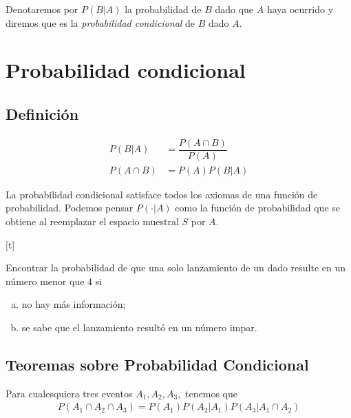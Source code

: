   Denotaremos por $P(B|A)$
 la probabilidad de $B$ dado que $A$ haya ocurrido y diremos que es la \emph{probabilidad condicional} de $B$ dado $A.$


 \section{Probabilidad condicional}

 \subsection{Definición}

{}
\begin{defn}
 \begin{align}
  P(B|A)&=\dfrac{P(A\cap B)}{P(A)} \\
  P(A\cap B) &= P(A)P(B|A)
 \end{align}
\end{defn}


{}
\begin{rem}
 La probabilidad condicional satisface todos los axiomas de una función de probabilidad.  Podemos pensar $P(\cdot|A)$ como la función de probabilidad que se obtiene al reemplazar el espacio muestral $S$ por $A.$
\end{rem}


[t]{}
\begin{ejemplo}
 \label{exmp:1.13}
 Encontrar la probabilidad de que una solo lanzamiento de un dado resulte en un número menor que $4$ si
 \begin{enumerate}[(a)]
  \item no hay más información; 
  \item se sabe que el lanzamiento resultó en un número impar.
 \end{enumerate}

\end{ejemplo}


\subsection{Teoremas sobre Probabilidad Condicional}
{}
\begin{thm}
 \label{thm:1.9}
 Para cualesquiera tres eventos $A_{1},A_{2},A_{3},$ tenemos que
 \begin{align}
  \label{1.19}
  P(A_{1} \cap A_{2} \cap A_{3})=P(A_{1})P(A_{2}|A_{1})P(A_{3}|A_{1} \cap A_{2})
 \end{align}
\end{thm}


